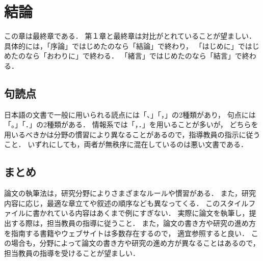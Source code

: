 \chapter{結論}	%
\thispagestyle{plain}   %

この章は最終章である．
第１章と最終章は対比がとれていることが望ましい．
具体的には，「序論」ではじめたのなら「結論」で終わり，
「はじめに」ではじめたのなら「おわりに」で終わる．
「緒言」ではじめたのなら「結言」で終わる．

\section{句読点}
日本語の文書で一般に用いられる読点には「、」「，」の2種類があり，
句点には「。」「．」の2種類がある．
情報系では「，．」を用いることが多いが，
どちらを用いるべきかは分野の慣習により異なることがあるので，指導教員の指示に従うこと．
いずれにしても，両者が無秩序に混在しているのは悪い文書である．

\section{まとめ}
論文の執筆法は，研究分野によりさまざまなルールや慣習がある．
また，研究内容に応じ，最適な章立てや叙述の順序なども異なってくる．
このスタイルファイルに書かれている内容はあくまで例にすぎない．
実際に論文を執筆し，提出する際は，担当教員の指導に従うこと．
また，論文の書き方や研究の進め方を指南する書籍やウェブサイトは多数存在するので，
適宜参照すると良い．
この場合も，分野によって論文の書き方や研究の進め方が異なることはあるので，
担当教員の指導を受けることが望ましい．
